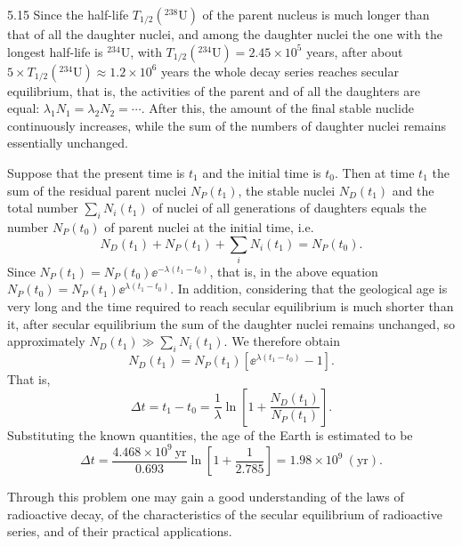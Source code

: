 \begin{solution}{5.15}
Since the half-life $T_{1/2}({}^{238}\mathrm{U})$ of the parent nucleus is much longer than that
of all the daughter nuclei, and among the daughter nuclei the one with the longest half-life is
${}^{234}\mathrm{U}$, with $T_{1/2}({}^{234}\mathrm{U})=2.45\times10^5$ years, after about
$5\times T_{1/2}({}^{234}\mathrm{U})\approx1.2\times10^6$ years the whole decay series reaches
secular equilibrium, that is, the activities of the parent and of all the daughters are equal:
$\lambda_1N_1=\lambda_2N_2=\cdots$. After this, the amount of the final stable nuclide
continuously increases, while the sum of the numbers of daughter nuclei remains essentially
unchanged.

Suppose that the present time is $t_1$ and the initial time is $t_0$. Then at time $t_1$ the sum
of the residual parent nuclei $N_P(t_1)$, the stable nuclei $N_D(t_1)$ and the total number
$\sum_iN_i(t_1)$ of nuclei of all generations of daughters equals the number $N_P(t_0)$ of
parent nuclei at the initial time, i.e.
\begin{equation*}
N_D(t_1)+N_P(t_1)+\sum_iN_i(t_1)=N_P(t_0).
\end{equation*}
Since $N_P(t_1)=N_P(t_0)\ee^{-\lambda(t_1-t_0)}$, that is, in the above equation
$N_P(t_0)=N_P(t_1)\ee^{\lambda(t_1-t_0)}$. In addition, considering that the geological age is
very long and the time required to reach secular equilibrium is much shorter than it, after
secular equilibrium the sum of the daughter nuclei remains unchanged, so approximately
$N_D(t_1)\gg\sum_iN_i(t_1)$. We therefore obtain
\begin{equation*}
N_D(t_1)=N_P(t_1)\left[\ee^{\lambda(t_1-t_0)}-1\right].
\end{equation*}
That is,
\begin{equation*}
\Delta t=t_1-t_0=\frac{1}{\lambda}\ln\left[1+\frac{N_D(t_1)}{N_P(t_1)}\right].
\end{equation*}
Substituting the known quantities, the age of the Earth is estimated to be
\begin{equation*}
\Delta t=\frac{4.468\times10^9\ \text{yr}}{0.693}\ln\left[1+\frac{1}{2.785}\right]
=1.98\times10^9\ (\text{yr}).
\end{equation*}

\begin{commentary}
Through this problem one may gain a good understanding of the laws of radioactive decay, of the
characteristics of the secular equilibrium of radioactive series, and of their practical
applications.
\end{commentary}
\end{solution}


